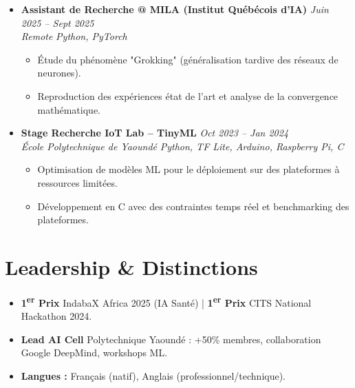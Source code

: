 \documentclass[a4paper,11pt]{article}
\begin{document}
\begin{itemize}[leftmargin=*, label={-}]
\item \textbf{Assistant de Recherche @ MILA (Institut Québécois d'IA)} \hfill \textit{Juin 2025 -- Sept 2025} \\
\textit{Remote} \hfill \textit{Python, PyTorch}
\vspace{-2pt}
    \begin{itemize}[leftmargin=0.4cm, nosep, label=\tiny$\bullet$]
        \item \small{Étude du phénomène "Grokking" (généralisation tardive des réseaux de neurones).}
        \item \small{Reproduction des expériences état de l'art et analyse de la convergence mathématique.}
    \end{itemize}
\vspace{3pt}

\item \textbf{Stage Recherche IoT Lab -- TinyML} \hfill \textit{Oct 2023 -- Jan 2024} \\
\textit{École Polytechnique de Yaoundé} \hfill \textit{Python, TF Lite, Arduino, Raspberry Pi, C}
\vspace{-2pt}
    \begin{itemize}[leftmargin=0.4cm, nosep, label=\tiny$\bullet$]
        \item \small{Optimisation de modèles ML pour le déploiement sur des plateformes à ressources limitées.}
        \item \small{Développement en C avec des contraintes temps réel et benchmarking des plateformes.}
    \end{itemize}
\vspace{3pt}

\end{itemize}

\section{Leadership \& Distinctions}
\begin{itemize}[leftmargin=*, label=\tiny$\bullet$, nosep]
    \item \small{\textbf{1\textsuperscript{er} Prix} IndabaX Africa 2025 (IA Santé) | \textbf{1\textsuperscript{er} Prix} CITS National Hackathon 2024.}
    \item \small{\textbf{Lead AI Cell} Polytechnique Yaoundé : +50\% membres, collaboration Google DeepMind, workshops ML.}
    \item \small{\textbf{Langues :} Français (natif), Anglais (professionnel/technique).}
\end{itemize}
\end{document}

